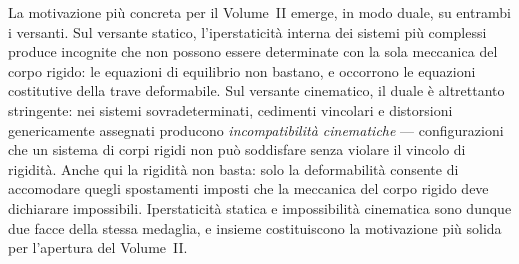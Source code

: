 La motivazione più concreta per il Volume~II emerge, in modo duale, su entrambi i
versanti. Sul versante statico, l'iperstaticità interna dei sistemi più complessi
produce incognite che non possono essere determinate con la sola meccanica del corpo
rigido: le equazioni di equilibrio non bastano, e occorrono le equazioni costitutive
della trave deformabile. Sul versante cinematico, il duale è altrettanto stringente:
nei sistemi sovradeterminati, cedimenti vincolari e distorsioni genericamente assegnati
producono \emph{incompatibilità cinematiche} --- configurazioni che un sistema di corpi
rigidi non può soddisfare senza violare il vincolo di rigidità. Anche qui la
rigidità non basta: solo la deformabilità consente di accomodare quegli spostamenti
imposti che la meccanica del corpo rigido deve dichiarare impossibili. Iperstaticità
statica e impossibilità cinematica sono dunque due facce della stessa medaglia, e
insieme costituiscono la motivazione più solida per l'apertura del Volume~II.